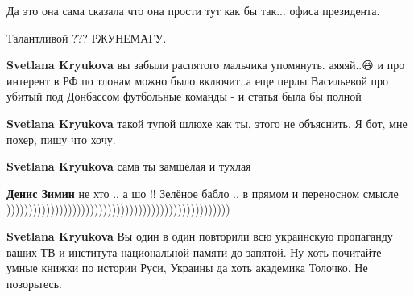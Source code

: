 \begin{itemize}
Да это она сама сказала что она прости тут как бы так... офиса президента.

 
Талантливой ??? РЖУНЕМАГУ.

 
\textbf{Svetlana Kryukova} вы забыли распятого мальчика упомянуть. аяяяй..😆 и про интерент в РФ по тлонам можно было включит..а еще перлы Васильевой про убитый под Донбассом футбольные команды - и статья была бы полной

 
\textbf{Svetlana Kryukova} такой тупой шлюхе как ты, этого не объяснить. Я бот, мне похер, пишу что хочу. 🤣🤣🤣

 
\textbf{Svetlana Kryukova} сама ты замшелая и тухлая

 
\textbf{Денис Зимин} не хто .. а шо !! Зелёное бабло .. в прямом и переносном смысле )))))))))))))))))))))))))))))))))))))))))))))))))))

 
\textbf{Svetlana Kryukova} Вы один в один повторили всю украинскую пропаганду ваших ТВ и института национальной памяти до запятой. Ну хоть почитайте умные книжки по истории Руси, Украины да хоть академика Толочко. Не позорьтесь.


\end{itemize}
